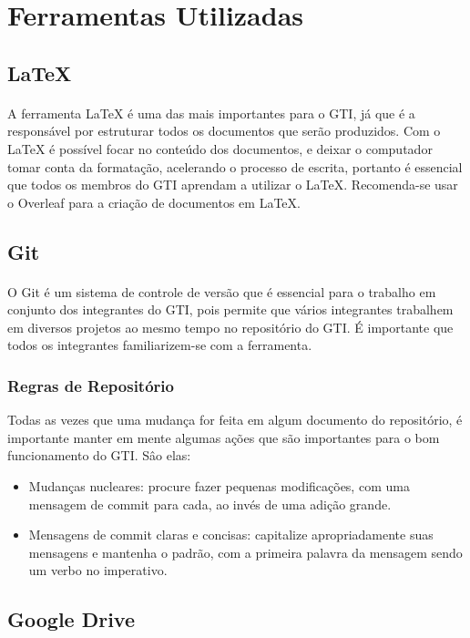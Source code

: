 \documentclass{article}
\begin{document}
\section{Ferramentas Utilizadas}
\subsection{LaTeX}
\paragraph{}
A ferramenta LaTeX é uma das mais importantes para o GTI, já que é a responsável por estruturar todos os documentos que serão produzidos. Com o LaTeX é possível focar no conteúdo dos documentos, e deixar o computador tomar conta da formatação, acelerando o processo de escrita, portanto é essencial que todos os membros do GTI aprendam a utilizar o LaTeX. Recomenda-se usar o Overleaf para a criação de documentos em LaTeX.

\subsection{Git}
\paragraph{}
O Git é um sistema de controle de versão que é essencial para o trabalho em conjunto dos integrantes do GTI, pois permite que vários integrantes trabalhem em diversos projetos ao mesmo tempo no repositório do GTI. É importante que todos os integrantes familiarizem-se com a ferramenta.
\subsubsection{Regras de Repositório}
Todas as vezes que uma mudança for feita em algum documento do repositório, é importante manter em mente algumas ações que são importantes para o bom funcionamento do GTI. Sâo elas:
\begin{itemize}
\item Mudanças nucleares: procure fazer pequenas modificações, com uma mensagem de commit para cada, ao invés de uma adição grande.
\item Mensagens de commit claras e concisas: capitalize apropriadamente suas mensagens e mantenha o padrão, com a primeira palavra da mensagem sendo um verbo no imperativo.
\end{itemize}

\subsection{Google Drive}
\end{document}
